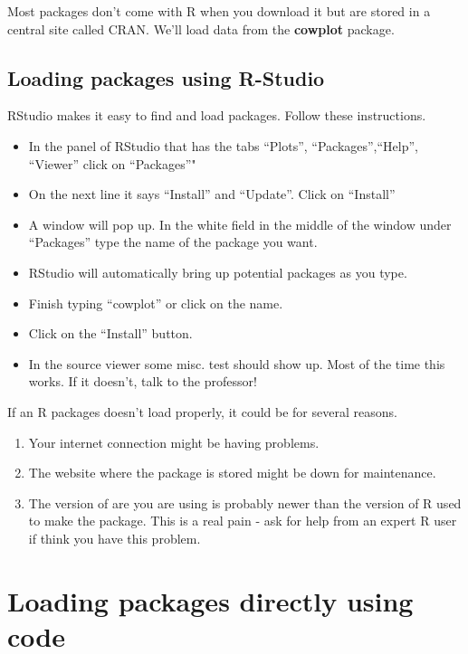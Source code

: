 \documentclass[]{book}
\providecommand{\tightlist}{%
  \setlength{\itemsep}{0pt}\setlength{\parskip}{0pt}}
\theoremstyle{definition}
\theoremstyle{definition}
\theoremstyle{definition}
\theoremstyle{remark}
\begin{document}
Most packages don't come with R when you download it but are stored in a
central site called CRAN. We'll load data from the \textbf{cowplot}
package.

\subsection{Loading packages using
R-Studio}\label{loading-packages-using-r-studio}

RStudio makes it easy to find and load packages. Follow these
instructions.

\begin{itemize}
\tightlist
\item
  In the panel of RStudio that has the tabs ``Plots'',
  ``Packages'',``Help'', ``Viewer'' click on ``Packages''"
\item
  On the next line it says ``Install'' and ``Update''. Click on
  ``Install''
\item
  A window will pop up. In the white field in the middle of the window
  under ``Packages'' type the name of the package you want.
\item
  RStudio will automatically bring up potential packages as you type.
\item
  Finish typing ``cowplot'' or click on the name.
\item
  Click on the ``Install'' button.
\item
  In the source viewer some misc. test should show up. Most of the time
  this works. If it doesn't, talk to the professor!
\end{itemize}

If an R packages doesn't load properly, it could be for several reasons.

\begin{enumerate}
\def\labelenumi{\arabic{enumi}.}
\tightlist
\item
  Your internet connection might be having problems.\\
\item
  The website where the package is stored might be down for
  maintenance.\\
\item
  The version of are you are using is probably newer than the version of
  R used to make the package. This is a real pain - ask for help from an
  expert R user if think you have this problem.
\end{enumerate}

\section{Loading packages directly using
code}\label{loading-packages-directly-using-code}
\end{document}
